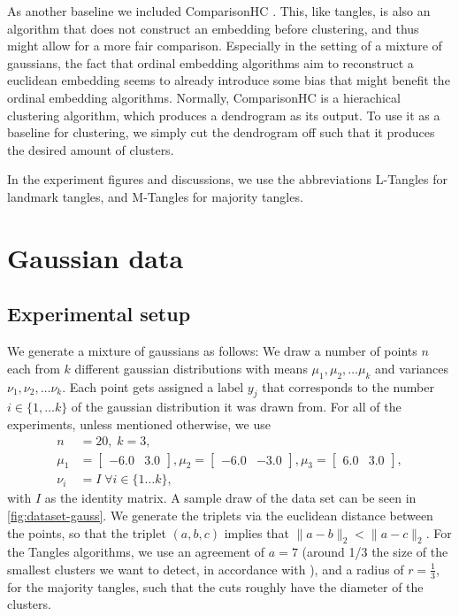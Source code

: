 As another baseline we included ComparisonHC \citep{ghoshdastidarFoundationsComparisonBasedHierarchical2019}. This, like tangles, is also an algorithm that does not construct an embedding before clustering,
and thus might allow for a more fair comparison. Especially in the setting of a mixture of gaussians, 
the fact that ordinal embedding algorithms aim to reconstruct a euclidean embedding seems to already introduce some bias that might benefit the ordinal embedding algorithms.
Normally, ComparisonHC is a hierachical clustering algorithm, which produces a dendrogram as its output. To use it as a baseline for clustering, we simply
cut the dendrogram off such that it produces the desired amount of clusters.

In the experiment figures and discussions, we use the abbreviations L-Tangles for landmark tangles, and M-Tangles for majority tangles.

\section{Gaussian data}\label{sec:gaussian_data}
\subsection{Experimental setup}
We generate a mixture of gaussians as follows: We draw a number of points $n$ each from $k$ different gaussian distributions with means $\mu_1, \mu_2, \ldots \mu_k$ and 
variances $\nu_1, \nu_2, \ldots \nu_k$. Each point gets assigned a label $y_j$ that corresponds to the number $i \in \{1, \ldots k\}$ of the gaussian distribution it was drawn from.
For all of the experiments, unless mentioned otherwise, we use 
\begin{align*}
    n&=20,\; k=3, \\
    \mu_1 &= \begin{bmatrix} -6.0 & 3.0 \end{bmatrix}, \mu_2 = \begin{bmatrix} -6.0 & -3.0 \end{bmatrix},  \mu_3 = \begin{bmatrix} 6.0 & 3.0 \end{bmatrix}, \\
    \nu_i &= I \;\forall i \in \{ 1\ldots k\},
\end{align*}
with $I$ as the identity matrix. A sample draw of the data set can be seen in \autoref{fig:dataset-gauss}. We generate the triplets via the euclidean distance between the points, so that
the triplet $(a,b,c)$ implies that $\|a - b\|_2 < \|a - c\|_2$. For the Tangles algorithms, we use an agreement of $a=7$ (around 1/3 the size of the smallest
clusters we want to detect, in accordance with \cite{klepperClusteringTanglesAlgorithmic2021}), and a radius of $r=\frac{1}{3}$, for the majority
tangles, such that the cuts roughly have the diameter of the clusters.

